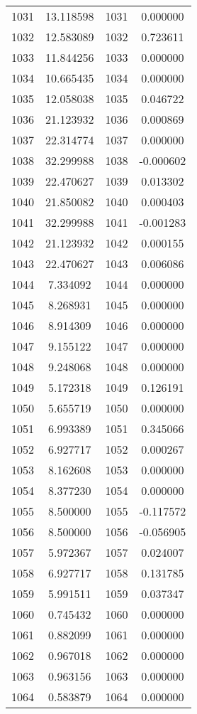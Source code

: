 \documentclass[12pt]{article}
\begin{document}
\begin{longtable}{@{}cccc@{}}
1031 & 13.118598 & 1031 & 0.000000 \\
1032 & 12.583089 & 1032 & 0.723611 \\
1033 & 11.844256 & 1033 & 0.000000 \\
1034 & 10.665435 & 1034 & 0.000000 \\
1035 & 12.058038 & 1035 & 0.046722 \\
1036 & 21.123932 & 1036 & 0.000869 \\
1037 & 22.314774 & 1037 & 0.000000 \\
1038 & 32.299988 & 1038 & -0.000602 \\
1039 & 22.470627 & 1039 & 0.013302 \\
1040 & 21.850082 & 1040 & 0.000403 \\
1041 & 32.299988 & 1041 & -0.001283 \\
1042 & 21.123932 & 1042 & 0.000155 \\
1043 & 22.470627 & 1043 & 0.006086 \\
1044 & 7.334092 & 1044 & 0.000000 \\
1045 & 8.268931 & 1045 & 0.000000 \\
1046 & 8.914309 & 1046 & 0.000000 \\
1047 & 9.155122 & 1047 & 0.000000 \\
1048 & 9.248068 & 1048 & 0.000000 \\
1049 & 5.172318 & 1049 & 0.126191 \\
1050 & 5.655719 & 1050 & 0.000000 \\
1051 & 6.993389 & 1051 & 0.345066 \\
1052 & 6.927717 & 1052 & 0.000267 \\
1053 & 8.162608 & 1053 & 0.000000 \\
1054 & 8.377230 & 1054 & 0.000000 \\
1055 & 8.500000 & 1055 & -0.117572 \\
1056 & 8.500000 & 1056 & -0.056905 \\
1057 & 5.972367 & 1057 & 0.024007 \\
1058 & 6.927717 & 1058 & 0.131785 \\
1059 & 5.991511 & 1059 & 0.037347 \\
1060 & 0.745432 & 1060 & 0.000000 \\
1061 & 0.882099 & 1061 & 0.000000 \\
1062 & 0.967018 & 1062 & 0.000000 \\
1063 & 0.963156 & 1063 & 0.000000 \\
1064 & 0.583879 & 1064 & 0.000000 \\

\end{longtable}
\end{document}
